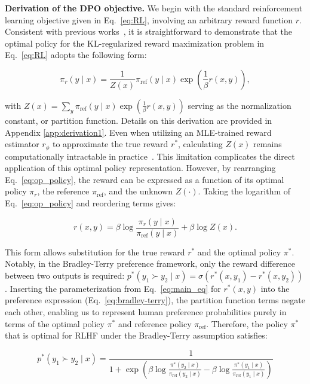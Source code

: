 \textbf{Derivation of the DPO objective.} We begin with the standard reinforcement learning objective given in Eq.~\ref{eq:RL}, involving an arbitrary reward function $r$. Consistent with previous works~\citep{peters2007reinforcement, peng2019advantage, korbak2022reinforcement, go2023aligning}, it is straightforward to demonstrate that the optimal policy for the KL-regularized reward maximization problem in Eq.~\ref{eq:RL} adopts the following form:

\begin{equation}\label{eq:op_policy}
    \pi_r(y\mid x) = \frac{1}{Z(x)}\pi_\text{ref}(y\mid x)\exp\left(\frac{1}{\beta}r(x, y)\right),
\end{equation}

with $Z(x) =\sum_{y}\pi_\text{ref}(y\mid x)\exp\left(\frac{1}{\beta}r(x, y)\right)$ serving as the normalization constant, or partition function. Details on this derivation are provided in Appendix \ref{app:derivation1}. Even when utilizing an MLE-trained reward estimator $r_{\phi}$ to approximate the true reward $r^*$, calculating $Z(x)$ remains computationally intractable in practice~\citep{korbak2022reinforcement, go2023aligning}. This limitation complicates the direct application of this optimal policy representation. However, by rearranging Eq.~\ref{eq:op_policy}, the reward can be expressed as a function of its optimal policy $\pi_r$, the reference $\pi_\text{ref}$, and the unknown $Z(\cdot)$. Taking the logarithm of Eq.~\ref{eq:op_policy} and reordering terms gives:

\begin{equation}\label{eq:main_eq}
    r(x,y) =\beta \log \frac{\pi_r(y\mid x)}{\pi_\text{ref}(y\mid x)} + \beta \log Z(x).
\end{equation}

This form allows substitution for the true reward $r^*$ and the optimal policy $\pi^*$. Notably, in the Bradley-Terry preference framework, only the reward difference between two outputs is required: ${p^*(y_1 \succ y_2 \mid x) = \sigma(r^*(x, y_1) - r^*(x, y_2))}$. Inserting the parameterization from Eq.~\ref{eq:main_eq} for $r^*(x,y)$ into the preference expression (Eq.~\ref{eq:bradley-terry}), the partition function terms negate each other, enabling us to represent human preference probabilities purely in terms of the optimal policy $\pi^*$ and reference policy $\pi_\text{ref}$. Therefore, the policy $\pi^*$ that is optimal for RLHF under the Bradley-Terry assumption satisfies:

\begin{equation}\label{eq:objective}
    p^*(y_1\succ y_2 \mid x)=\frac{1}{1 + \exp\left(\beta \log \frac{\pi^*(y_2\mid x)}{\pi_\text{ref}(y_2\mid x)} - \beta \log \frac{\pi^*(y_1\mid x)}{\pi_\text{ref}(y_1\mid x)}\right)}
\end{equation}

